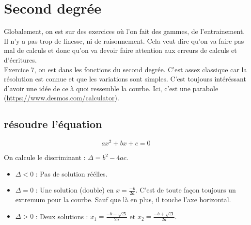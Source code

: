 \documentclass[11pt]{article}
\begin{document}

\newtheorem{Definition}{Définition}
\newtheorem{Theorem}{Théorème}
\newtheorem{Proposition}{Propriété}

\renewcommand{\labelitemi}{$\bullet$}
\renewcommand{\labelitemii}{$\circ$}

\setlength{\columnseprule}{1pt}

\section{Second degrée}

Globalement, on est sur des exercices où l'on fait des gammes, de l'entrainement. Il n'y a pas trop de finesse, ni de raisonnement. Cela veut dire qu'on va faire pas mal de calculs et donc qu'on va devoir faire attention aux erreurs de calculs et d'écritures.\\ 

Exercice 7, on est dans les fonctions du second degrée. C'est assez classique car la résolution est connue et que les variations sont simples. C'est toujours intéréssant d'avoir une idée de ce à quoi ressemble la courbe. Ici, c'est une parabole (\url{https://www.desmos.com/calculator}). 


\subsection{résoudre l'équation}

$$ax^2 +bx +c =0$$

On calcule le discriminant : $\Delta = b^2 - 4ac$.\\

\begin{itemize}
\item $\Delta < 0$ : Pas de solution réélles.
\item $\Delta = 0$ : Une solution (double) en $x = \frac{-b}{2a}$. C'est de toute façon toujours un extremum pour la courbe. Sauf que là en plus, il touche l'axe horizontal.
\item $\Delta > 0$ : Deux solutions : $x_1 = \frac{-b - \sqrt{\Delta}}{2a}$ et $x_2 = \frac{-b + \sqrt{\Delta}}{2a}$. 
\end{itemize}
\end{document}
